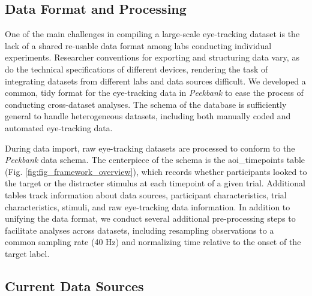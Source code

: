 \documentclass[10pt, letterpaper]{article}
\begin{document}
\hypertarget{data-format-and-processing}{%
\subsection{Data Format and
Processing}\label{data-format-and-processing}}

One of the main challenges in compiling a large-scale eye-tracking
dataset is the lack of a shared re-usable data format among labs
conducting individual experiments. Researcher conventions for exporting
and structuring data vary, as do the technical specifications of
different devices, rendering the task of integrating datasets from
different labs and data sources difficult. We developed a common, tidy
format for the eye-tracking data in \emph{Peekbank} to ease the process
of conducting cross-dataset analyses. The schema of the database is
sufficiently general to handle heterogeneous datasets, including both
manually coded and automated eye-tracking data.

During data import, raw eye-tracking datasets are processed to conform
to the \emph{Peekbank} data schema. The centerpiece of the schema is the
aoi\_timepoints table (Fig. \ref{fig:fig_framework_overview}), which
records whether participants looked to the target or the distracter
stimulus at each timepoint of a given trial. Additional tables track
information about data sources, participant characteristics, trial
characteristics, stimuli, and raw eye-tracking data information. In
addition to unifying the data format, we conduct several additional
pre-processing steps to facilitate analyses across datasets, including
resampling observations to a common sampling rate (40 Hz) and
normalizing time relative to the onset of the target label.

\hypertarget{current-data-sources}{%
\subsection{Current Data Sources}\label{current-data-sources}}
\end{document}
